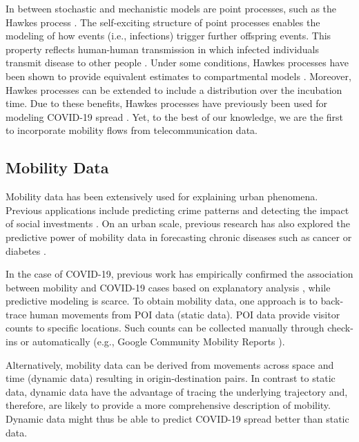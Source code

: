 \documentclass[sigconf, review = false, nonacm = true]{acmart}
\begin{document}
In between stochastic and mechanistic models are point processes, such as the Hawkes process \cite{hawkes_cluster_1974}. The self-exciting structure of point processes enables the modeling of how events (i.e., infections) trigger further offspring events. This property reflects human-human transmission in which infected individuals transmit disease to other people \cite{bertozzi_challenges_2020}. Under some conditions, Hawkes processes have been shown to provide equivalent estimates to compartmental models \cite{rizoiu_sir-hawkes_2018}. Moreover, Hawkes processes can be extended to include a distribution over the incubation time. Due to these benefits, Hawkes processes have previously been used for modeling COVID-19 spread \cite{bertozzi_challenges_2020, chiang_hawkes_2020, mohler_analyzing_2020}. Yet, to the best of our knowledge, we are the first to incorporate mobility flows from telecommunication data.

\subsection{Mobility Data}
\label{sec:mobilityData}

Mobility data has been extensively used for explaining urban phenomena. Previous applications include predicting crime patterns \cite{kadar_leveraging_2020} and detecting the impact of social investments \cite{zhou_cultural_2017}. On an urban scale, previous research has also explored the predictive power of mobility data in forecasting chronic diseases such as cancer or diabetes \cite{wang_predicting_2018}.

In the case of COVID-19, previous work has empirically confirmed the association between mobility and COVID-19 cases based on explanatory analysis \cite{xiong_mobile_2020, persson_monitoring_2021}, while predictive modeling is scarce. To obtain mobility data, one approach is to back-trace human movements from POI data (static data). POI data provide visitor counts to specific locations. Such counts can be collected manually through check-ins or automatically (e.g., Google Community Mobility Reports \cite{google_llc_google_2020}).

Alternatively, mobility data can be derived from movements across space and time (dynamic data) resulting in origin-destination pairs. In contrast to static data, dynamic data have the advantage of tracing the underlying trajectory and, therefore, are likely to provide a more comprehensive description of mobility. Dynamic data might thus be able to predict COVID-19 spread better than static data. 
\end{document}
